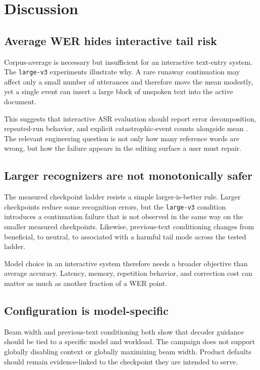 \section{Discussion}

\subsection{Average WER hides interactive tail risk}

Corpus-average \wer{} is necessary but insufficient for an interactive text-entry system. The
\texttt{large-v3} experiments illustrate why. A rare runaway continuation may affect only a
small number of utterances and therefore move the mean modestly, yet a single event can insert a
large block of unspoken text into the active document.

This suggests that interactive ASR evaluation should report error decomposition, repeated-run
behavior, and explicit catastrophic-event counts alongside mean \wer{}. The relevant engineering
question is not only how many reference words are wrong, but how the failure appears in the
editing surface a user must repair.

\subsection{Larger recognizers are not monotonically safer}

The measured checkpoint ladder resists a simple larger-is-better rule. Larger checkpoints reduce
some recognition errors, but the \texttt{large-v3} condition introduces a continuation failure
that is not observed in the same way on the smaller measured checkpoints. Likewise,
previous-text conditioning changes from beneficial, to neutral, to associated with a harmful
tail mode across the tested ladder.

Model choice in an interactive system therefore needs a broader objective than average accuracy.
Latency, memory, repetition behavior, and correction cost can matter as much as another fraction
of a WER point.

\subsection{Configuration is model-specific}

Beam width and previous-text conditioning both show that decoder guidance should be tied to a
specific model and workload. The campaign does not support globally disabling context or globally
maximizing beam width. Product defaults should remain evidence-linked to the checkpoint they are
intended to serve.

